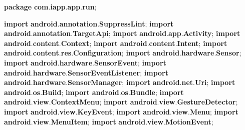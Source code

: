 \documentclass[
]{article}
\newenvironment{Shaded}{}{}
\newcommand{\ImportTok}[1]{\textcolor[rgb]{0.00,0.50,0.00}{\textbf{#1}}}
\newcommand{\KeywordTok}[1]{\textcolor[rgb]{0.00,0.44,0.13}{\textbf{#1}}}
\newcommand{\OperatorTok}[1]{\textcolor[rgb]{0.40,0.40,0.40}{#1}}
\begin{document}
\begin{Shaded}
\begin{Highlighting}[]
\KeywordTok{package}\ImportTok{ com}\OperatorTok{.}\ImportTok{iapp}\OperatorTok{.}\ImportTok{app}\OperatorTok{.}\ImportTok{run}\OperatorTok{;}

\KeywordTok{import} \ImportTok{android}\OperatorTok{.}\ImportTok{annotation}\OperatorTok{.}\ImportTok{SuppressLint}\OperatorTok{;}
\KeywordTok{import} \ImportTok{android}\OperatorTok{.}\ImportTok{annotation}\OperatorTok{.}\ImportTok{TargetApi}\OperatorTok{;}
\KeywordTok{import} \ImportTok{android}\OperatorTok{.}\ImportTok{app}\OperatorTok{.}\ImportTok{Activity}\OperatorTok{;}
\KeywordTok{import} \ImportTok{android}\OperatorTok{.}\ImportTok{content}\OperatorTok{.}\ImportTok{Context}\OperatorTok{;}
\KeywordTok{import} \ImportTok{android}\OperatorTok{.}\ImportTok{content}\OperatorTok{.}\ImportTok{Intent}\OperatorTok{;}
\KeywordTok{import} \ImportTok{android}\OperatorTok{.}\ImportTok{content}\OperatorTok{.}\ImportTok{res}\OperatorTok{.}\ImportTok{Configuration}\OperatorTok{;}
\KeywordTok{import} \ImportTok{android}\OperatorTok{.}\ImportTok{hardware}\OperatorTok{.}\ImportTok{Sensor}\OperatorTok{;}
\KeywordTok{import} \ImportTok{android}\OperatorTok{.}\ImportTok{hardware}\OperatorTok{.}\ImportTok{SensorEvent}\OperatorTok{;}
\KeywordTok{import} \ImportTok{android}\OperatorTok{.}\ImportTok{hardware}\OperatorTok{.}\ImportTok{SensorEventListener}\OperatorTok{;}
\KeywordTok{import} \ImportTok{android}\OperatorTok{.}\ImportTok{hardware}\OperatorTok{.}\ImportTok{SensorManager}\OperatorTok{;}
\KeywordTok{import} \ImportTok{android}\OperatorTok{.}\ImportTok{net}\OperatorTok{.}\ImportTok{Uri}\OperatorTok{;}
\KeywordTok{import} \ImportTok{android}\OperatorTok{.}\ImportTok{os}\OperatorTok{.}\ImportTok{Build}\OperatorTok{;}
\KeywordTok{import} \ImportTok{android}\OperatorTok{.}\ImportTok{os}\OperatorTok{.}\ImportTok{Bundle}\OperatorTok{;}
\KeywordTok{import} \ImportTok{android}\OperatorTok{.}\ImportTok{view}\OperatorTok{.}\ImportTok{ContextMenu}\OperatorTok{;}
\KeywordTok{import} \ImportTok{android}\OperatorTok{.}\ImportTok{view}\OperatorTok{.}\ImportTok{GestureDetector}\OperatorTok{;}
\KeywordTok{import} \ImportTok{android}\OperatorTok{.}\ImportTok{view}\OperatorTok{.}\ImportTok{KeyEvent}\OperatorTok{;}
\KeywordTok{import} \ImportTok{android}\OperatorTok{.}\ImportTok{view}\OperatorTok{.}\ImportTok{Menu}\OperatorTok{;}
\KeywordTok{import} \ImportTok{android}\OperatorTok{.}\ImportTok{view}\OperatorTok{.}\ImportTok{MenuItem}\OperatorTok{;}
\KeywordTok{import} \ImportTok{android}\OperatorTok{.}\ImportTok{view}\OperatorTok{.}\ImportTok{MotionEvent}\OperatorTok{;}

\end{Highlighting}
\end{Shaded}
\end{document}
